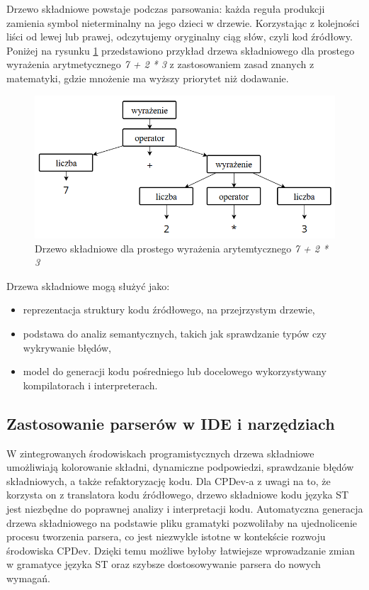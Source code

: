 \documentclass[12pt,twoside]{article}
\begin{document}
Drzewo składniowe powstaje podczas parsowania: każda reguła produkcji zamienia symbol nieterminalny na jego dzieci w drzewie. Korzystając z kolejności liści od lewej lub prawej, odczytujemy oryginalny ciąg słów, czyli kod źródłowy. Poniżej na rysunku \ref{Fig:simpleGrammarTree} przedstawiono przykład drzewa składniowego dla prostego wyrażenia arytmetycznego \textit{7 + 2 * 3} z zastosowaniem zasad znanych z matematyki, gdzie mnożenie ma wyższy priorytet niż dodawanie.

\begin{figure}[ht]
   \centering
   \includegraphics[width=15cm]{images/grammarTreeSimple.png}
   \caption{Drzewo składniowe dla prostego wyrażenia arytemtycznego \textit{7 + 2 * 3}}
   \label{Fig:simpleGrammarTree}
\end{figure}


Drzewa składniowe mogą służyć jako:
\begin{itemize}[label=\textbullet, leftmargin=1.25cm]
   \item reprezentacja struktury kodu źródłowego, na przejrzystym drzewie,
   \item podstawa do analiz semantycznych, takich jak sprawdzanie typów czy wykrywanie błędów,
   \item model do generacji kodu pośredniego lub docelowego wykorzystywany kompilatorach i interpreterach.
\end{itemize}

\subsection{Zastosowanie parserów w IDE i narzędziach}
W zintegrowanych środowiskach programistycznych drzewa składniowe umożliwiają kolorowanie składni, dynamiczne podpowiedzi, sprawdzanie błędów składniowych, a także refaktoryzację kodu. Dla CPDev-a z uwagi na to, że korzysta on z translatora kodu źródłowego, drzewo składniowe kodu języka ST jest niezbędne do poprawnej analizy i interpretacji kodu. Automatyczna generacja drzewa składniowego na podstawie pliku gramatyki pozwoliłaby na ujednolicenie procesu tworzenia parsera, co jest niezwykle istotne w kontekście rozwoju środowiska CPDev. Dzięki temu możliwe byłoby łatwiejsze wprowadzanie zmian w gramatyce języka ST oraz szybsze dostosowywanie parsera do nowych wymagań.
\clearpage
\end{document}
